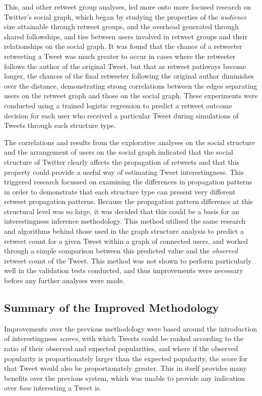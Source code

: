 This, and other retweet group analyses, led more onto more focused research on Twitter's social graph, which began by studying the properties of the \textit{audience} size attainable through retweet groups, and the overhead generated through shared followships, and ties between users involved in retweet groups and their relationships on the social graph. It was found that the chance of a retweeter retweeting a Tweet was much greater to occur in cases where the retweeter follows the author of the original Tweet, but that as retweet pathways become longer, the chances of the final retweeter following the original author diminishes over the distance, demonstrating strong correlations between the edges separating users on the retweet graph and those on the social graph. These experiments were conducted using a trained logistic regression to predict a retweet outcome decision for each user who received a particular Tweet during simulations of Tweets through each structure type.

The correlations and results from the explorative analyses on the social structure and the arrangement of users on the social graph indicated that the social structure of Twitter clearly affects the propagation of retweets and that this property could provide a useful way of estimating Tweet interestingness. This triggered research focussed on examining the differences in propagation patterns in order to demonstrate that each structure type can present very different retweet propagation patterns. Because the propagation pattern difference at this structural level was so large, it was decided that this could be a basis for an interestingness inference methodology. This method utilised the same research and algorithms behind those used in the graph structure analysis to predict a retweet count for a given Tweet within a graph of connected users, and worked through a simple comparison between this predicted value and the \textit{observed} retweet count of the Tweet. This method was not shown to perform particularly well in the validation tests conducted, and thus improvements were necessary before any further analyses were made.


\subsection{Summary of the Improved Methodology}
Improvements over the previous methodology were based around the introduction of interestingness \textit{scores}, with which Tweets could be ranked according to the ratio of their observed and expected popularities, and where if the observed popularity is proportionately larger than the expected popularity, the score for that Tweet would also be proportionately greater. This in itself provides many benefits over the previous system, which was unable to provide any indication over \textit{how} interesting a Tweet is.

